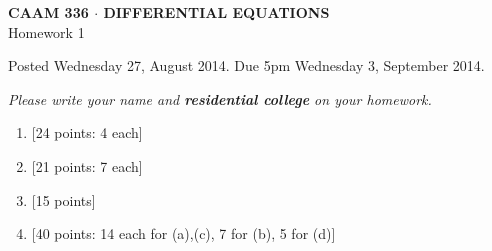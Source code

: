 \documentclass[10pt]{article}
\begin{document}
\newcommand{\pd}[3]{\frac{\partial^{#3} #1}{\partial #2^{#3}}}

\vspace*{-5em}
\begin{center}
\large \textsf{\textbf{CAAM 336 $\cdot$ DIFFERENTIAL EQUATIONS}\\[0.5em]
Homework 1 }
\end{center}

Posted Wednesday 27, August 2014.  Due 5pm Wednesday 3, September 2014.

\begin{center}
\emph{Please write your name and \textbf{residential college} on your homework.}
\end{center}

\begin{enumerate}
\item {[24 points: 4 each]}  
\newpage
\item {[21 points: 7 each]}  
\newpage
\item {[15 points]}  
\newpage
\item {[40 points: 14 each for (a),(c), 7 for (b), 5 for (d)]}  


\end{enumerate}
\end{document}
